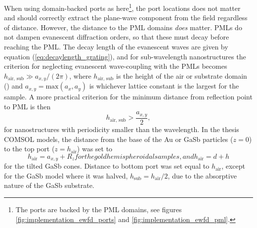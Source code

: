 When using domain-backed ports as here\footnote{The ports are backed by the PML domains, see figures \ref{fig:implementation_ewfd_ports} and \ref{fig:implementation_ewfd_pml}.}, the port locations does not matter  and should correctly extract the plane-wave component from the field regardless of distance. However, the distance to the PML domains \emph{does} matter. PMLs do not dampen evanescent diffraction orders, so that these must decay before reaching the PML\cite{PML_reflectionOfEvanescentWaves1}\cite{PML_reflectionOfEvanescentWaves2}. The decay length of the evanescent waves are given by equation (\ref{eq:decaylength_grating}), and for sub-wavelength nanostructures the criterion for neglecting evanescent wave-coupling with the PMLs becomes $h_{\text{air, sub}}\gg a_{x,y}/(2\pi)$, where $h_{\text{air, sub}}$ is the height of the air or substrate domain () and  $a_{x,y}=\text{max}(a_x,a_y)$ is whichever lattice constant is the largest for the sample\cite{decaylength_comsolsupport}. A more practical criterion for the minimum distance from reflection point to PML is then 
\begin{equation}
    h_{\text{air, sub}}> \frac{a_{x,y}}{2},
    \label{eq:height_physicaldomain}
\end{equation}
for nanostructures with periodicity smaller than the wavelength\cite{decaylength_comsolsupport}. In the thesis COMSOL models, the distance from the base of the Au or GaSb particles ($z=0$) to the top port ($z=h_{\text{air}}$) was set to
\begin{subequations}
\begin{equation}
    h_{\text{air}} = a_{x,y} + R_z
\end{equation}
for the gold hemispheroidal samples, and
\begin{equation}
    h_{\text{air}} = d + h
\end{equation}
\end{subequations}
for the tilted GaSb cones. Distance to bottom port was set equal to $ h_{\text{air}}$, except for the GaSb model where it was halved, $h_{\text{sub}} = h_{\text{air}}/2$, due to the absorptive nature of the GaSb substrate.

